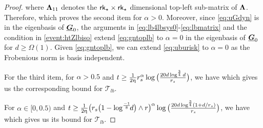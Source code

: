 \begin{proof}
{}
where $\boldsymbol{\Lambda}_{11}$ denotes the $\mathsf{rk}_{\star} \times \mathsf{rk}_{\star}$ dimensional top-left sub-matrix of $\boldsymbol{\Lambda}$.
Therefore, 
which proves the second item for $\alpha > 0$.  Moreover, since \eqref{eq:uGdyn} is in the eigenbasis of $\underline{\boldsymbol{G}}_{0}$, the arguments in \eqref{eq:lb4lbsys0}-\eqref{eq:lbmatrix} and the condition in \ref{event:htZlbiso}  extend \eqref{eq:gntoplb} to $\alpha = 0$ in the eigenbasis of $\underline{\boldsymbol{G}}_{0}$ for $d \geq \Omega(1)$.   Given \eqref{eq:gntoplb}, we can extend  \eqref{eq:uburisk} to $\alpha = 0$ as the Frobenious norm is basis independent.

 
\smallskip 
For  the third item,  for $\alpha>0.5$ and  $t \geq   \frac{1}{2 \upeta}  r_s^{\alpha} \log \big( \tfrac{  20 d \log^{\frac{3}{4}} d}{r_s}   \big)$,  we have 
which gives us the corresponding bound for $\mathcal{T}_{lb}$.    

For  $\alpha \in [0,0.5)$ and  $t \geq   \frac{1}{2 \upeta}    \big(   r_s \big(1 - \log^{\frac{- 1}{8}} \!\! d  \big) \wedge r  \big)^{\alpha} \log \big( \tfrac{  20 d \log^{\frac{3}{4}} (1 +d/r_s)}{r_s}   \big)$,  we have 
which gives us its bound for $\mathcal{T}_{lb}$.  
\end{proof}  

